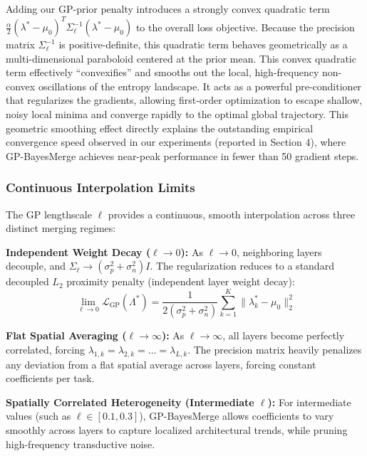 Adding our GP-prior penalty introduces a strongly convex quadratic term
$\frac{\alpha}{2} (\lambda^* - \mu_0)^T \Sigma_{\ell}^{-1} (\lambda^* - \mu_0)$
to the overall loss objective. Because the precision matrix $\Sigma_{\ell}^{-1}$
is positive-definite, this quadratic term behaves geometrically as a
multi-dimensional paraboloid centered at the prior mean. This convex quadratic
term effectively ``convexifies'' and smooths out the local, high-frequency
non-convex oscillations of the entropy landscape. It acts as a powerful
pre-conditioner that regularizes the gradients, allowing first-order
optimization to escape shallow, noisy local minima and converge rapidly to the
optimal global trajectory. This geometric smoothing effect directly explains the
outstanding empirical convergence speed observed in our experiments (reported
in Section 4), where GP-BayesMerge achieves near-peak performance in fewer than
50 gradient steps.

\subsubsection{Continuous Interpolation Limits}

The GP lengthscale $\ell$ provides a continuous, smooth interpolation across
three distinct merging regimes:

\textbf{Independent Weight Decay ($\ell \to 0$):} As $\ell \to 0$, neighboring
layers decouple, and $\Sigma_{\ell} \to (\sigma_p^2 + \sigma_n^2) I$. The
regularization reduces to a standard decoupled $L_2$ proximity penalty
(independent layer weight decay):
\begin{equation}
\lim_{\ell \to 0} \mathcal{L}_{\text{GP}}(\Lambda^*) = \frac{1}{2(\sigma_p^2 +
\sigma_n^2)} \sum_{k=1}^K \|\lambda_k^* - \mu_0\|_2^2
\end{equation}

\textbf{Flat Spatial Averaging ($\ell \to \infty$):} As $\ell \to \infty$, all
layers become perfectly correlated, forcing $\lambda_{1, k} = \lambda_{2, k} =
\dots = \lambda_{L, k}$. The precision matrix heavily penalizes any deviation
from a flat spatial average across layers, forcing constant coefficients per
task.

\textbf{Spatially Correlated Heterogeneity (Intermediate $\ell$):} For
intermediate values (such as $\ell \in [0.1, 0.3]$), GP-BayesMerge allows
coefficients to vary smoothly across layers to capture localized architectural
trends, while pruning high-frequency transductive noise.


